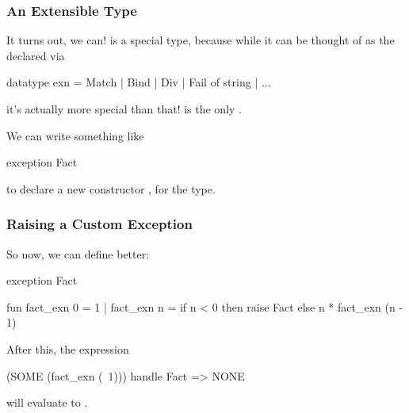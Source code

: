 \documentclass[aspectratio=169]{beamer}
\begin{document}
\begin{frame}[fragile]
  \frametitle{An Extensible Type}

  \tgs

  It turns out, we can!  is a special type, because while it can be
  thought of as the  declared via
  \begin{codeblock}
    datatype exn = Match | Bind | Div | Fail of string | ...
  \end{codeblock}
  it's actually more special than that!  is the only 
  .\footnotemark

  \pause
  \vspace{\fill}


  \pause
  \vspace{\fill}

  We can write something like
  \begin{codeblock}
    exception Fact
  \end{codeblock}
  to declare a new constructor , for the  type.

\end{frame}

\begin{frame}[fragile]
  \frametitle{Raising a Custom Exception}

  So now, we can define  better: 
  \begin{codeblock}
    exception Fact 

    fun fact_exn 0 = 1
      | fact_exn n = 
          if n < 0 then 
            raise Fact
          else
            n * fact_exn (n - 1)
  \end{codeblock}

  \pause
  \vspace{\fill}

  After this, the expression
  \begin{codeblock}
    (SOME (fact_exn (~1))) handle Fact => NONE
  \end{codeblock}
  will evaluate to .
\end{frame}
\end{document}
